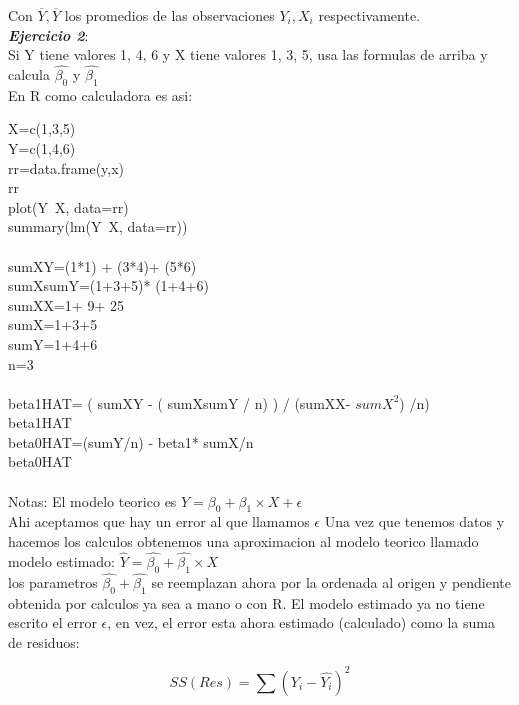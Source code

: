 \documentclass[letterpaper,11pt]{article}\usepackage[]{graphicx}\usepackage[]{color}
\begin{document}
Con $\overline{Y}, \overline{Y}$ los promedios de las observaciones $Y_{i}, X_{i}$	respectivamente.\\
\textbf{\textit{Ejercicio 2}}:\\
	
Si Y tiene valores 1, 4, 6 y X tiene valores 1, 3, 5, usa las formulas de arriba y calcula $\hat{\beta_{0}}$ y $\hat{\beta_{1}}$ \\
En R como calculadora es asi:

X=c(1,3,5) \\
Y=c(1,4,6) \\
rr=data.frame(y,x) \\
rr \\
plot(Y~X, data=rr) \\
summary(lm(Y~X, data=rr)) \\ \\

sumXY=(1*1) + (3*4)+ (5*6) \\
sumXsumY=(1+3+5)* (1+4+6) \\
sumXX=1+ 9+ 25 \\
sumX=1+3+5 \\
sumY=1+4+6 \\
n=3 \\ \\

beta1HAT= ( sumXY - ( sumXsumY / n) ) / (sumXX- ${sumX}^2$) /n) \\
beta1HAT \\
beta0HAT=(sumY/n) - beta1* sumX/n \\
beta0HAT \\ \\

Notas:
El modelo teorico es $Y= \beta_{0} + \beta_{1} \times X + \epsilon$ \\Ahi aceptamos que hay un error al que llamamos $\epsilon$
Una vez que tenemos datos y hacemos los calculos obtenemos una aproximacion al modelo teorico llamado 
modelo estimado: $\hat{Y}= \hat{\beta_{0}} + \hat{\beta_{1}} \times X$ \\ 
los parametros $\hat{\beta_{0}} + \hat{\beta_{1}}$ se reemplazan ahora por la ordenada al origen y pendiente obtenida por
calculos ya sea a mano o con R. El modelo estimado ya no tiene escrito el error $\epsilon$,
en vez, el error esta ahora estimado (calculado) como la suma de residuos:  

	\begin{equation}
	SS(Res)= \sum(Y_{i}- \hat{Y_{i}})^2
	\end{equation}
	
\end{document}
